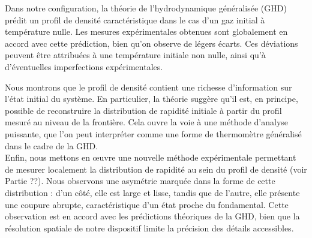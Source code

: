 


Dans notre configuration, la théorie de l’hydrodynamique généralisée (GHD) prédit un profil de densité caractéristique dans le cas d’un gaz initial à température nulle. Les mesures expérimentales obtenues sont globalement en accord avec cette prédiction, bien qu’on observe de légers écarts. Ces déviations peuvent être attribuées à une température initiale non nulle, ainsi qu’à d’éventuelles imperfections expérimentales.

Nous montrons que le profil de densité contient une richesse d’information sur l’état initial du système. En particulier, la théorie suggère qu’il est, en principe, possible de reconstruire la distribution de rapidité initiale à partir du profil mesuré au niveau de la frontière. Cela ouvre la voie à une méthode d’analyse puissante, que l’on peut interpréter comme une forme de thermomètre généralisé dans le cadre de la GHD.\\

Enfin, nous mettons en œuvre une nouvelle méthode expérimentale permettant de mesurer localement la distribution de rapidité au sein du profil de densité (voir Partie {??}). Nous observons une asymétrie marquée dans la forme de cette distribution : d’un côté, elle est large et lisse, tandis que de l’autre, elle présente une coupure abrupte, caractéristique d’un état proche du fondamental. Cette observation est en accord avec les prédictions théoriques de la GHD, bien que la résolution spatiale de notre dispositif limite la précision des détails accessibles.


